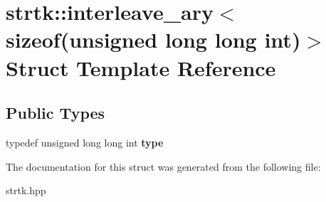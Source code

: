 \hypertarget{structstrtk_1_1interleave__ary_3_01sizeof_07unsigned_01long_01long_01int_08_4}{\section{strtk\-:\-:interleave\-\_\-ary$<$ sizeof(unsigned long long int)$>$ Struct Template Reference}
\label{structstrtk_1_1interleave__ary_3_01sizeof_07unsigned_01long_01long_01int_08_4}
}
\subsection*{Public Types}
\begin{DoxyCompactItemize}
\item 
\hypertarget{structstrtk_1_1interleave__ary_3_01sizeof_07unsigned_01long_01long_01int_08_4_a16a70190b15362eac20a30b45cf86269}{typedef unsigned long long int {\bfseries type}}\label{structstrtk_1_1interleave__ary_3_01sizeof_07unsigned_01long_01long_01int_08_4_a16a70190b15362eac20a30b45cf86269}

\end{DoxyCompactItemize}


The documentation for this struct was generated from the following file\-:\begin{DoxyCompactItemize}
\item 
strtk.\-hpp\end{DoxyCompactItemize}
